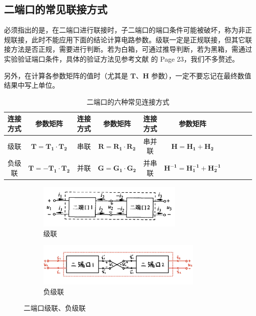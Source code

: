 \documentclass[UTF8]{report}
\theoremstyle{MyLineTheoremStyle} %
\theoremstyle{MyBlockTheoremStyle} %
\theoremstyle{MySubsubsectionStyle} %
\begin{document}
\subsection{二端口的常见联接方式}

必须指出的是，在二端口进行联接时，子二端口的端口条件可能被破坏，称为非正规联接，此时不能应用下面的结论计算电路参数。级联一定是正规联接，但其它联接方法是否正规，需要进行判断。若为白箱，可通过推导判断，若为黑箱，需通过实验验证端口条件，具体的验证方法见参考文献 \cite{电路原理导学导教} 的 Page 23，我们不多赘述。

另外，在计算各参数矩阵的值时（尤其是 $\boldsymbol{T}$、$\boldsymbol{H}$ 参数），一定不要忘记在最终数值结果中写上单位。

\begin{table}[H]\centering
    \caption{二端口的六种常见连接方式}
    \label{二端口的六种常见连接方式}
\begin{tabular}{cccccccccc}\toprule
    连接方式 & 参数矩阵 & 连接方式 & 参数矩阵 & 连接方式 & 参数矩阵\\
    \midrule
    级联  &  $\boldsymbol{T} = \boldsymbol{T_1}\cdot \boldsymbol{T_2}$    &   串联 & $\boldsymbol{R} = \boldsymbol{R_1} \cdot \boldsymbol{R_2}$ & 串并联 & $\boldsymbol{H} = \boldsymbol{H_1} + \boldsymbol{H_2}$ \\ 
    负级联 &  $\boldsymbol{T} = -\boldsymbol{T_1}\cdot \boldsymbol{T_2}$  &   并联 & $\boldsymbol{G} = \boldsymbol{G_1}\cdot \boldsymbol{G_2}$ & 并串联 & $\boldsymbol{H^{-1}} = \boldsymbol{H_1^{-1}} + \boldsymbol{H_2^{-1}}$\\ 
    \bottomrule
\end{tabular}
\end{table}

\begin{figure}[H]\centering
\begin{subfigure}[t]{0.42\textwidth}\centering
    \includegraphics[height=60pt]{assets/2/级联.png}
    \caption{ 级联 }
\end{subfigure}\begin{subfigure}[t]{0.58\textwidth}\centering
    \includegraphics[height=60pt]{assets/2/负级联.png}
    \caption{ 负级联 }
\end{subfigure}
\caption{ 二端口级联、负级联}
\end{figure}
\end{document}
